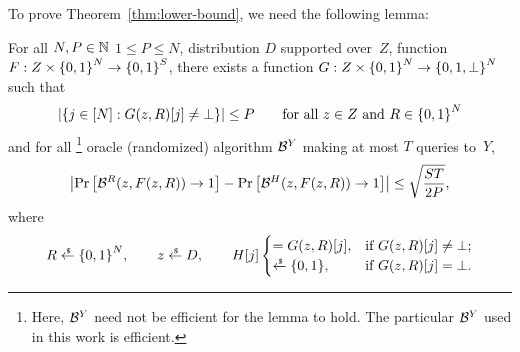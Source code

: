 To prove Theorem~\ref{thm:lower-bound}, we need the following lemma:

\begin{lemma}\label{lem:ai-rom}
For all ${N,P\in{\mathbb{N}}}$  ${1\leq P\leq N}$,
distribution $D$ supported over~$Z$,
function ${F:Z\times{\{0,1\}}^N\to{\{0,1\}}^S}$,
there exists a function ${G:Z\times\bit^N\to{\{0,1,\bot\}}^N}$ such that
\begin{align*}
|\{{j\in[N]}:{G(z,R)[j]\neq\bot}\}|\leq P
\qquad\textup{for all }z\in Z\textup{ and }R\in\bit^N
\end{align*}
and for all%
\footnote{Here, ${\mathcal{B}}^Y$ need not be efficient for the lemma to hold.
The particular ${\mathcal{B}}^Y$ used in this work is efficient.}
oracle (randomized) algorithm ${\mathcal{B}}^Y$ making at most $T$ queries to~$Y$,
\begin{align*}
\left|
\Pr\left[{\mathcal{B}}^R(z,F(z,R))\to 1\right]
-
\Pr\left[{\mathcal{B}}^H(z,F(z,R))\to 1\right]
\right|
\leq
\sqrt{\frac{ST}{2P}},
\end{align*}
where
\begin{align*}
R\draws\bit^N,\qquad
z\draws D,\qquad
H[j]\begin{cases}
=G(z,R)[j],&\textup{if }G(z,R)[j]\neq\bot;\\
\draws\bit,&\textup{if }G(z,R)[j]=\bot.
\end{cases}
\end{align*}
\end{lemma}

